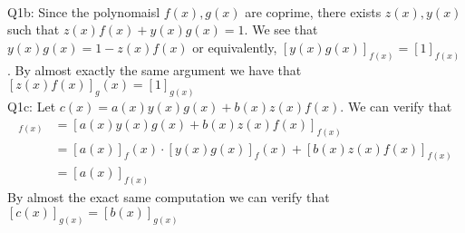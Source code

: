 \documentclass[letterpaper]{article}
\begin{document}
\newline \\ Q1b: Since the polynomaisl $f(x),g(x)$ are coprime, there exists $z(x),y(x)$ such that $z(x)f(x) + y(x)g(x)=1$. We see that $y(x)g(x) = 1 - z(x)f(x)$ or equivalently, $[y(x)g(x)]_{f(x)} = [1]_{f(x)}$. By almost exactly the same argument we have that $[z(x)f(x)]_g(x) = [1]_{g(x)}$ 
\newline \\ Q1c: Let $c(x) = a(x)y(x)g(x) + b(x)z(x)f(x)$. We can verify that 
\begin{align*}
[c(x)]_{f(x)} & = [a(x)y(x)g(x) + b(x)z(x)f(x)]_{f(x)}
\\ & = [a(x)]_f(x) \cdot [y(x)g(x)]_f(x) + [b(x)z(x)f(x)]_{f(x)}
\\ & = [a(x)]_{f(x)}
\end{align*} By almost the exact same computation we can verify that $[c(x)]_{g(x)} = [b(x)]_{g(x)}$
\end{document}
